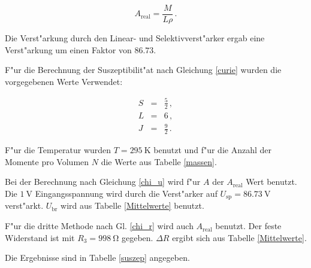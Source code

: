	\begin{equation}
		A_\mathrm{real} = \frac{M}{L \rho} \, .
	\end{equation}

	Die Verst"arkung durch den Linear- und Selektivverst"arker ergab eine Verst"arkung um einen Faktor von $86.73$.

	F"ur die Berechnung der Suszeptibilit"at nach Gleichung \eqref{curie} wurden die vorgegebenen Werte Verwendet:

	\begin{eqnarray*}
		S &=& \frac{5}{2} \, ,\\
		L &=& 6 \, ,\\
		J &=& \frac{9}{2} \, .
	\end{eqnarray*}

	F"ur die Temperatur wurden $T = \SI{295}{\kelvin}$ benutzt und f"ur die Anzahl der Momente pro Volumen $N$ die Werte aus Tabelle \ref{massen}.

	Bei der Berechnung nach Gleichung \eqref{chi_u} wird f"ur $A$ der $A_\mathrm{real}$ Wert benutzt. Die $\SI{1}{\volt}$ Eingangsspannung wird durch die Verst"arker auf $U_\mathrm{sp} = \SI{86.73}{\volt}$ verst"arkt.
	$U_\mathrm{br}$ wird aus Tabelle \ref{Mittelwerte} benutzt.

	F"ur die dritte Methode nach Gl. \eqref{chi_r} wird auch $A_\mathrm{real}$ benutzt. Der feste Widerstand ist mit $R_\mathrm{3} = \SI{998}{\ohm}$ gegeben.
	$\Delta R$ ergibt sich aus Tabelle \ref{Mittelwerte}.

	Die Ergebnisse sind in Tabelle \ref{suszep} angegeben.

	
	
	
	
	
	
	

	\clearpage